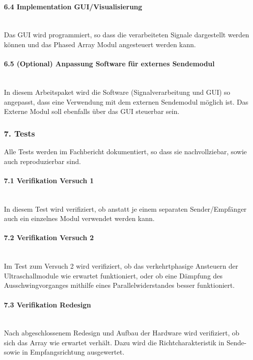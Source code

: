 \documentclass[10pt,a4paper,oneside]{99_fhnwreport}
\begin{document}
\paragraph{6.4 Implementation GUI/Visualisierung}\\
Das GUI wird programmiert, so dass die verarbeiteten Signale dargestellt werden können und das Phased Array Modul angesteuert werden kann.

\paragraph{6.5 (Optional) Anpassung Software für externes Sendemodul}\\
In diesem Arbeitspaket wird die Software (Signalverarbeitung und GUI) so angepasst, dass eine Verwendung mit dem externen Sendemodul möglich ist. Das Externe Modul soll ebenfalls über das GUI steuerbar sein.

\subsubsection*{7. Tests}
Alle Tests werden im Fachbericht dokumentiert, so dass sie nachvollziebar, sowie auch reproduzierbar sind.

\paragraph{7.1 Verifikation Versuch 1}\\
In diesem Test wird verifiziert, ob anstatt je einem separaten Sender/Empfänger auch ein einzelnes Modul verwendet werden kann.

\paragraph{7.2 Verifikation Versuch 2}\\
Im Test zum Versuch 2 wird verifiziert, ob das verkehrtphasige Ansteuern der Ultraschallmodule wie erwartet funktioniert, oder ob eine Dämpfung des Ausschwingvorganges mithilfe eines Parallelwiderstandes besser funktioniert.

\paragraph{7.3 Verifikation Redesign}\\
Nach abgeschlossenem Redesign und Aufbau der Hardware wird verifiziert, ob sich das Array wie erwartet verhält. Dazu wird die Richtcharakteristik in Sende- sowie in Empfangsrichtung ausgewertet.
\end{document}
